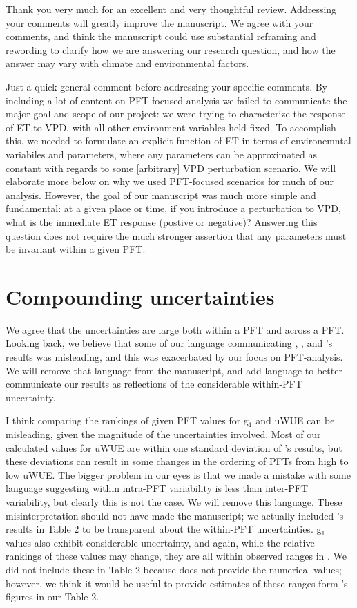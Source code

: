 \RequirePackage{natbib}


Thank you very much for an excellent and very thoughtful
review. Addressing your comments will greatly improve the
manuscript. We agree with your comments, and think the manuscript
could use substantial reframing and rewording to clarify how we are
answering our research question, and how the answer may vary with
climate and environmental factors.

Just a quick general comment before addressing your specific
comments. By including a lot of content on PFT-focused analysis we
failed to communicate the major goal and scope of our project: we were
trying to characterize the response of ET to VPD, with all other
environment variables held fixed. To accomplish this, we needed to
formulate an explicit function of ET in terms of environemntal
variabiles and parameters, where any parameters can be approximated as
constant with regards to some [arbitrary] VPD perturbation
scenario. We will elaborate more below on why we used PFT-focused
scenarios for much of our analysis. However, the goal of our
manuscript was much more simple and fundamental: at a given place or
time, if you introduce a perturbation to VPD, what is the immediate ET
response (postive or negative)? Answering this question does not
require the much stronger assertion that any parameters must be
invariant within a given PFT.

\section{Compounding uncertainties}

We agree that the uncertainties are large both within a PFT and across
a PFT. Looking back, we believe that some of our language
communicating \cite{Lin_2018}, \cite{Medlyn_2017}, and
\cite{Zhou_2014}'s results was misleading, and this was exacerbated by
our focus on PFT-analysis. We will remove that language from the
manuscript, and add language to better communicate our results as
reflections of the considerable within-PFT uncertainty.

I think comparing the rankings of given PFT values for g$_1$ and uWUE
can be misleading, given the magnitude of the uncertainties
involved. Most of our calculated values for uWUE are within one
standard deviation of \cite{Zhou_2015}'s results, but these deviations
can result in some changes in the ordering of PFTs from high to low
uWUE. The bigger problem in our eyes is that we made a mistake with
some language suggesting within intra-PFT variability is less than
inter-PFT variability, but clearly this is not the case. We will
remove this language. These misinterpretation should not have made the
manuscript; we actually included \cite{Zhou_2015}'s results in Table 2
to be transparent about the within-PFT uncertainties. g$_1$ values
also exhibit considerable uncertainty, and again, while the relative
rankings of these values may change, they are all within observed
ranges in \cite{Medlyn_2017}. We did not include these in Table 2
because \cite{Medlyn_2017} does not provide the numerical values;
however, we think it would be useful to provide estimates of these
ranges form \cite{Medlyn_2017}'s figures in our Table 2.

